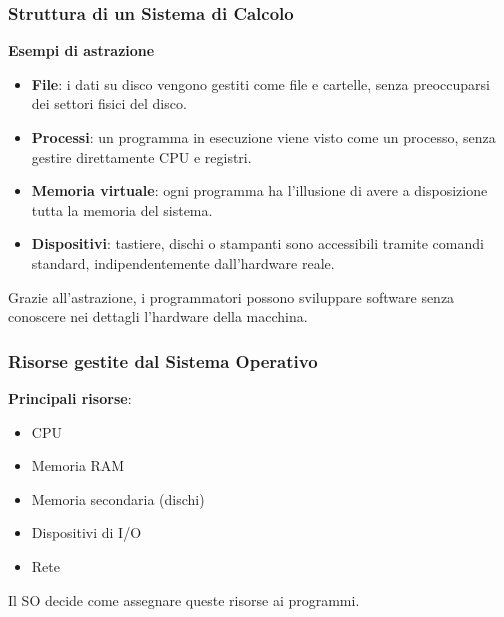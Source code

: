 \documentclass{beamer}
\begin{document}
		\begin{frame}
		\frametitle{Struttura di un Sistema di Calcolo}
	
		\textbf{Esempi di astrazione}
		
		\begin{itemize}
			\item \textbf{File}: i dati su disco vengono gestiti come file e cartelle,
			senza preoccuparsi dei settori fisici del disco.
			\item \textbf{Processi}: un programma in esecuzione viene visto come un
			processo, senza gestire direttamente CPU e registri.
			\item \textbf{Memoria virtuale}: ogni programma ha l'illusione di avere
			a disposizione tutta la memoria del sistema.
			\item \textbf{Dispositivi}: tastiere, dischi o stampanti sono accessibili
			tramite comandi standard, indipendentemente dall'hardware reale.
		\end{itemize}
		
		
		Grazie all'astrazione, i programmatori possono sviluppare software
		senza conoscere nei dettagli l'hardware della macchina.
		
	\end{frame}

	\begin{frame}
		\frametitle{Risorse gestite dal Sistema Operativo}
		
		\textbf{Principali risorse}:
		
		\begin{itemize}
			\item CPU
			\item Memoria RAM
			\item Memoria secondaria (dischi)
			\item Dispositivi di I/O
			\item Rete
		\end{itemize}
		
		Il SO decide come assegnare queste risorse ai programmi.
		
	\end{frame}
	
	
\end{document}
